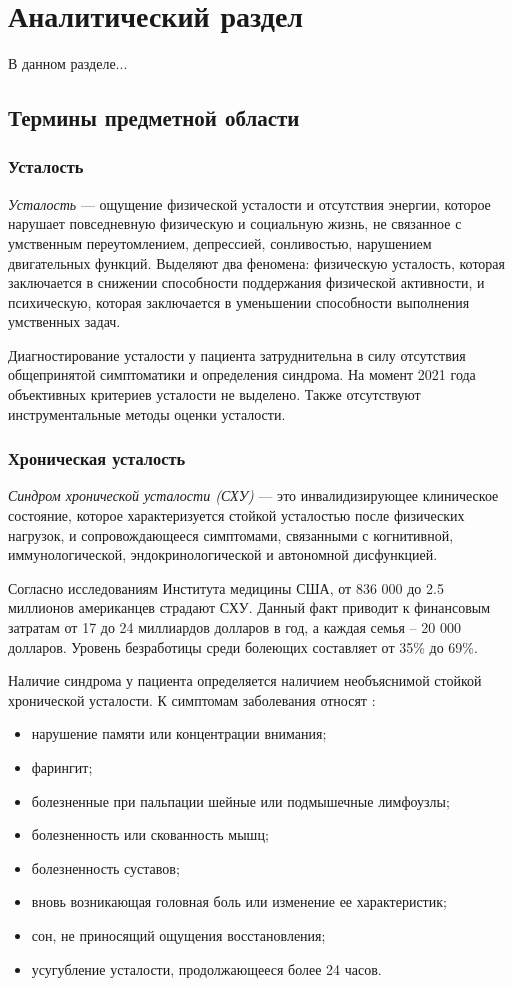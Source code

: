 \section{Аналитический раздел}
В данном разделе...

\subsection{Термины предметной области}
\subsubsection{Усталость}
\textit{Усталость} --- ощущение физической усталости и отсутствия энергии, которое нарушает повседневную физическую и социальную жизнь, не связанное с умственным переутомлением, депрессией, сонливостью, нарушением двигательных функций. Выделяют два феномена: физическую усталость, которая заключается в снижении способности поддержания физической активности, и психическую, которая заключается в уменьшении способности выполнения умственных задач. \cite{fatigueAsSymptom}

Диагностирование усталости у пациента затруднительна в силу отсутствия общепринятой симптоматики и определения синдрома. На момент 2021 года объективных критериев усталости не выделено. Также отсутствуют инструментальные методы оценки усталости. \cite{fatigueAsSymptom}

\subsubsection{Хроническая усталость}
\textit{Синдром хронической усталости (СХУ)} --- это инвалидизирующее клиническое состояние, которое характеризуется стойкой усталостью после физических нагрузок, и сопровождающееся симптомами, связанными с когнитивной, иммунологической, эндокринологической и автономной дисфункцией. \cite{syndromOfChrono}

Согласно исследованиям Института медицины США, от 836 000 до 2.5 миллионов американцев страдают СХУ. Данный факт приводит к финансовым затратам от 17 до 24 миллиардов долларов в год, а каждая семья -- 20 000 долларов. Уровень безработицы среди болеющих составляет от 35\% до 69\%. \cite{fatigueChronoInvestigation}

Наличие синдрома у пациента определяется наличием необъяснимой стойкой хронической усталости. К симптомам заболевания относят \cite{syndromOfChrono}:
\begin{itemize}[leftmargin=1.6\parindent]
\item нарушение памяти или концентрации внимания;
\item фарингит;
\item болезненные при пальпации шейные или подмышечные лимфоузлы;
\item болезненность или скованность мышц;
\item болезненность суставов;
\item вновь возникающая головная боль или изменение ее характеристик;
\item сон, не приносящий ощущения восстановления;
\item усугубление усталости, продолжающееся более 24 часов.
\end{itemize}

